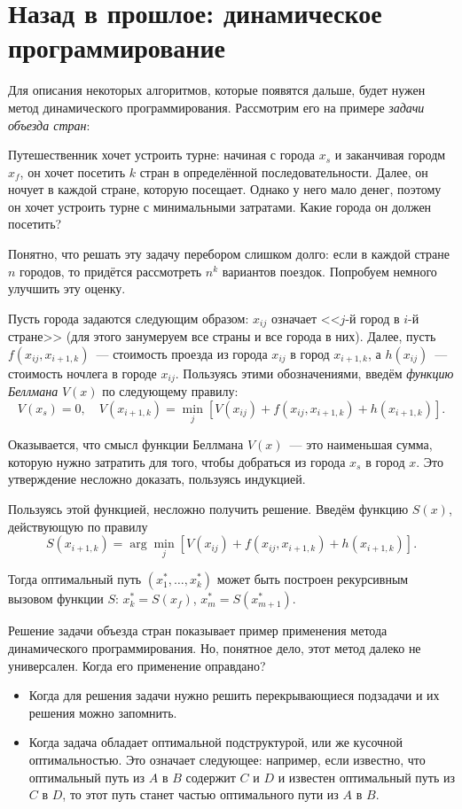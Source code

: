 \section{Назад в прошлое: динамическое программирование}
Для описания некоторых алгоритмов, которые появятся дальше, будет нужен метод 
динамического программирования. Рассмотрим его на примере \emph{задачи объезда 
стран}:
\begin{problem}
	Путешественник хочет устроить турне: начиная с города \(x_{s}\) и 
	заканчивая городм \(x_{f}\), он хочет посетить \(k\) стран в определённой 
	последовательности. Далее, он ночует в каждой стране, которую посещает. 
	Однако у него мало денег, поэтому он хочет устроить турне с минимальными 
	затратами. Какие города он должен посетить?
\end{problem}
Понятно, что решать эту задачу перебором слишком долго: если в каждой стране 
\(n\) городов, то придётся рассмотреть \(n^{k}\) вариантов поездок. Попробуем 
немного улучшить эту оценку.

Пусть города задаются следующим образом: \(x_{ij}\) означает <<\(j\)-й город в 
\(i\)-й стране>> (для этого занумеруем все страны и все города в них). Далее, 
пусть \(f(x_{ij}, x_{i + 1, k})\)~--- стоимость проезда из города \(x_{ij}\) в 
город \(x_{i + 1, k}\), а \(h(x_{ij})\)~--- стоимость ночлега в городе 
\(x_{ij}\). Пользуясь этими обозначениями, введём \emph{функцию Беллмана} 
\(V(x)\) по следующему правилу: 
\[
	V(x_{s}) = 0, \quad V(x_{i + 1, k}) = \min\limits_{j}\left[V(x_{ij}) + 
	f(x_{ij}, x_{i + 1, k}) + h(x_{i + 1, k})\right].
\]

Оказывается, что смысл функции Беллмана \(V(x)\)~--- это наименьшая сумма, 
которую нужно затратить для того, чтобы добраться из города \(x_{s}\) в город 
\(x\). Это утверждение несложно доказать, пользуясь индукцией.

Пользуясь этой функцией, несложно получить решение. Введём функцию \(S(x)\), 
действующую по правилу
\[
	S(x_{i + 1, k}) = \arg\min\limits_{j}\left[V(x_{ij}) + f(x_{ij}, x_{i + 1, 
	k}) + h(x_{i + 1, k})\right].
\]

Тогда оптимальный путь \((x_{1}^{*}, \ldots, x_{k}^{*})\) может быть построен 
рекурсивным вызовом функции \(S\): \(x_{k}^{*} = S(x_{f})\), \(x_{m}^{*} = 
S(x_{m + 1}^{*})\). %

Решение задачи объезда стран показывает пример применения метода динамического 
программирования. Но, понятное дело, этот метод далеко не универсален. Когда 
его применение оправдано?
\begin{itemize}
	\item Когда для решения задачи нужно решить перекрывающиеся подзадачи и их 
	решения можно запомнить.
	\item Когда задача обладает оптимальной подструктурой, или же кусочной 
	оптимальностью. Это означает следующее: например, если известно, что 
	оптимальный путь из \(A\) в \(B\) содержит \(C\) и \(D\) и известен 
	оптимальный путь из \(C\) в \(D\), то этот путь станет частью оптимального 
	пути из \(A\) в \(B\).
\end{itemize}

